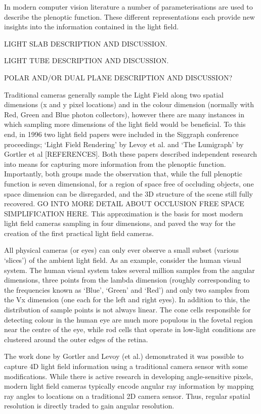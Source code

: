 In modern computer vision literature a number of parameterisations are used to describe the plenoptic function.
These different representations each provide new insights into the information contained in the light field.

LIGHT SLAB DESCRIPTION AND DISCUSSION.

LIGHT TUBE DESCRIPTION AND DISCUSSION.

POLAR AND/OR DUAL PLANE DESCRIPTION AND DISCUSSION?


Traditional cameras generally sample the Light Field along two spatial dimensions (x and y pixel locations) and in the colour dimension (normally with Red, Green and Blue photon collectors), however there are many instances in which sampling more dimensions of the light field would be beneficial. To this end, in 1996 two light field papers were included in the Siggraph conference proceedings; ‘Light Field Rendering’ by Levoy et al. and ‘The Lumigraph’ by Gortler et al [REFERENCES]. Both these papers described independent research into means for capturing more information from the plenoptic function. Importantly, both groups made the observation that, while the full plenoptic function is seven dimensional, for a region of space free of occluding objects, one space dimension can be disregarded, and the 3D structure of the scene still fully recovered. GO INTO MORE DETAIL ABOUT OCCLUSION FREE SPACE SIMPLIFICATION HERE. This approximation is the basis for most modern light field cameras sampling in four dimensions, and paved the way for the creation of the first practical light field cameras.

All physical cameras (or eyes) can only ever observe a small subset (various ‘slices’) of the ambient light field. As an example, consider the human visual system. The human visual system takes several million samples from the angular dimensions, three points from the lambda dimension (roughly corresponding to the frequencies known as ‘Blue’, ‘Green’ and ‘Red’) and only two samples from the Vx dimension (one each for the left and right eyes). In addition to this, the distribution of sample points is not always linear. The cone cells responsible for detecting colour in the human eye are much more populous in the fovetal region near the centre of the eye, while rod cells that operate in low-light conditions are clustered around the outer edges of the retina.

The work done by Gortler and Levoy (et al.) demonstrated it was possible to capture 4D light field information using a traditional camera sensor with some modifications. While there is active research in developing angle-sensitive pixels, modern light field cameras typically encode angular ray information by mapping ray angles to locations on a traditional 2D camera sensor. Thus, regular spatial resolution is directly traded to gain angular resolution.


